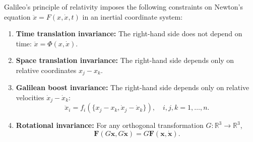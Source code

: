 Galileo's principle of relativity imposes the following constraints on Newton's equation $\ddot{x} = F(x, \dot{x}, t)$ in an inertial coordinate system:

\begin{enumerate}
\item \textbf{Time translation invariance:} The right-hand side does not depend on time: $\ddot{x} = \Phi(x, \dot{x})$.

\item \textbf{Space translation invariance:} The right-hand side depends only on relative coordinates $x_j - x_k$.

\item \textbf{Galilean boost invariance:} The right-hand side depends only on relative velocities $\dot{x}_j - \dot{x}_k$:
$$\ddot{x}_i = f_i(\{x_j - x_k, \dot{x}_j - \dot{x}_k\}), \quad i, j, k = 1, \ldots, n.$$

\item \textbf{Rotational invariance:} For any orthogonal transformation $G: \mathbb{R}^3 \rightarrow \mathbb{R}^3$,
$$\mathbf{F}(G\mathbf{x}, G\dot{\mathbf{x}}) = G\mathbf{F}(\mathbf{x}, \dot{\mathbf{x}}).$$
\end{enumerate}
